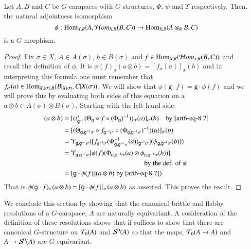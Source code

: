 \begin{prop}\label{art6-proposition-8.9}
Let $A, B$ and $C$ be $G$-carapaces with $G$-structures, $\Phi$, $\psi$ and $\Upsilon$ respectively. Then, the natural adjointness isomorphism
$$
\phi : \operatorname{Hom}_{X, R}(A, \mathcal{H} om_{X, R}(B, C)) \rightarrow \operatorname{Hom}_{X, R}(A\otimes_{R}B, C)
$$
is a $G$-morphism. 
\end{prop}

\begin{proof}
Fix $\sigma \in X$, $A \in A(\sigma)$, $b \in B(\sigma)$ and $f \in \operatorname{Hom}_{X, R}(\mathcal{H} om_{x, R}(B, C))$ and recall the definition of $\phi$. It is $\phi(f)_{\sigma}(a\otimes b) =\left[f_{\sigma}(a)\right]_{\sigma}(b)$ and in interpreting this formula one must remember that $f_{\sigma}(a) \in \Hom_{X, (\sigma), R}\break (B|_{X(\sigma)}, C|X(\sigma))$. We will show that $\phi(\mathsf{g} \cdot f) = \mathsf{g} \cdot \phi(f)$ and we will prove this by evaluating both sides of this equation on a $a\otimes b \in A(\sigma) \otimes B(\sigma)$. Starting with the left hand side:
\begin{align*}
[\phi(\Gg \cdot f)_{\sigma}](a\otimes b) &= [(t_{\Gg^{-1}}^{*}(\Theta_{\Gg} \circ f \circ (\Phi_{\Gg})^{-1}))_{\sigma}(a)]_{\sigma}(b) \quad \text{by} \;\ref{art6-eq-8.7}\\
& = [(\Theta_{\Gg, \Gg^{-1} \sigma} \circ f_{\Gg^{-1}\sigma} \circ (\Phi_{\Gg, \Gg^{-1}\sigma})^{-1})(a)]_{\sigma}(b)\\
& = \Upsilon_{\Gg, \Gg^{-1}\sigma}([f_{g^{-1}\sigma}(\Phi_{\Gg, \Gg^{-1}\sigma}^{-1}(a))_{\Gg^{-1}\sigma}](\psi_{\Gg, \Gg^{-1}\sigma}(b)))\\
& = \Upsilon_{\Gg, \Gg^{-1}\sigma}[\phi(f)(\Phi_{\Gg, \Gg^{-1}\sigma}(a)\otimes \phi_{\Gg, \Gg^{-1}\sigma}(b))] \\
&\qquad \qquad \qquad \qquad \qquad \qquad \text{by the def. of}\; \psi\\
& =[\Gg \cdot \phi (f)](a \otimes b) \; \text{by} \;\ref{art6-eq-8.7})
\end{align*}
That is $\phi(\mathsf{g} \cdot f)_{\sigma}(a\otimes b) = [\mathsf{g} \cdot \phi(f)]_{\sigma}(a \otimes b)$ as asserted. This proves the result.
\end{proof}

We conclude this section by showing that the canonical brittle and flabby resolutions of a $G$-carapace, $A$ are naturally equivariant. A cosideration of the definition of these resolutions shows that if suffices to show that there are canonical $G$-structure on $\mathcal{T}_{0}(A)$ and $\mathcal{S}^{0}(A)$ so that the maps, $\mathcal{T}_{0}(A \rightarrow A)$ and $A \rightarrow \mathcal{S}^{0}(A)$ are $G$-equivariant.

